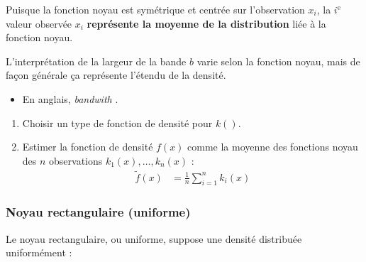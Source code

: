 \documentclass[10pt, french]{article}
\begin{document}
\begin{multicols*}{2}
\begin{definitionNOHFILLsub}
\begin{rappel_enhanced}[Contexte]
Puisque la fonction noyau est symétrique et centrée sur l'observation $x_{i}$, la $i^{\text{e}}$ valeur observée $x_{i}$ \textbf{représente la moyenne de la distribution} liée à la fonction noyau.
\end{rappel_enhanced}
\end{definitionNOHFILLsub}

\begin{definitionNOHFILLsub}
L'interprétation de la largeur de la bande $b$ varie selon la fonction noyau, mais de façon générale ça représente l'étendu de la densité.

\bigskip

\begin{itemize}
	\item	En anglais, \og \textit{bandwith} \fg{}.
\end{itemize}
\end{definitionNOHFILLsub}

	
\begin{definitionNOHFILLprop}
\begin{enumerate}[label = \circled{\arabic*}{trueblue}]
	\item	Choisir un type de fonction de densité pour $k()$.
	\item	Estimer la fonction de densité $f(x)$ comme la moyenne des fonctions noyau des $n$ observations $k_{1}(x), \dots, k_{n}(x)$ : 
		\begin{align*}
		\tilde{f}(x)
		&=	\frac{1}{n} \sum_{i = 1}^{n} k_{i}(x)
		\end{align*}
\end{enumerate}
\end{definitionNOHFILLprop}
	

\subsubsection{Noyau rectangulaire (uniforme)}
\begin{definitionNOHFILLsub}
Le noyau rectangulaire, ou uniforme, suppose une densité distribuée uniformément : 
\begin{center}
\begin{tikzpicture}[x=0.75pt,y=0.75pt,yscale=-1,xscale=1]


\end{tikzpicture}
\end{center}
\end{definitionNOHFILLsub}
\end{multicols*}
\end{document}
